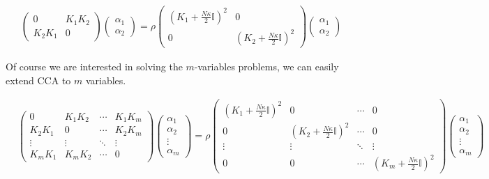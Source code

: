 \documentclass[a4paper,BCOR=5mm,oneside,openany]{scrreprt}
\begin{document}
\begin{align*}
	\begin{pmatrix}
		0 & K_1 K_2 \\
		K_2 K_1 & 0
	\end{pmatrix} \begin{pmatrix}
		\alpha_1 \\ \alpha_2
	\end{pmatrix}
	= \rho \begin{pmatrix}
		(K_1+\frac{N \kappa}{2} \mathbb{I})^2 & 0 \\
		0 & (K_2+\frac{N \kappa}{2} \mathbb{I})^2
	\end{pmatrix} \begin{pmatrix}
		\alpha_1 \\ \alpha_2
	\end{pmatrix}
\end{align*}

Of course we are interested in solving the $m$-variables problems, we can easily extend CCA to $m$ variables.

\begin{align*}
	&\begin{pmatrix}
		0 & K_1 K_2  & \cdots & K_1 K_m\\
		K_2 K_1 & 0 & \cdots & K_2 K_m \\
		\vdots & \vdots & \ddots & \vdots \\
		K_m K_1 & K_m K_2 & \cdots & 0
	\end{pmatrix} \begin{pmatrix}
		\alpha_1 \\ \alpha_2 \\ \vdots \\ \alpha_m
	\end{pmatrix} = \rho \begin{pmatrix}
		(K_1+\frac{N \kappa}{2} \mathbb{I})^2 & 0  & \cdots & 0\\
		0 & (K_2+\frac{N \kappa}{2} \mathbb{I})^2 & \cdots & 0 \\
		\vdots & \vdots & \ddots & \vdots \\
		0 & 0 & \cdots & (K_m+\frac{N \kappa}{2} \mathbb{I})^2
	\end{pmatrix} \begin{pmatrix}
		\alpha_1 \\ \alpha_2 \\ \vdots \\ \alpha_m
	\end{pmatrix}
\end{align*}
\end{document}
